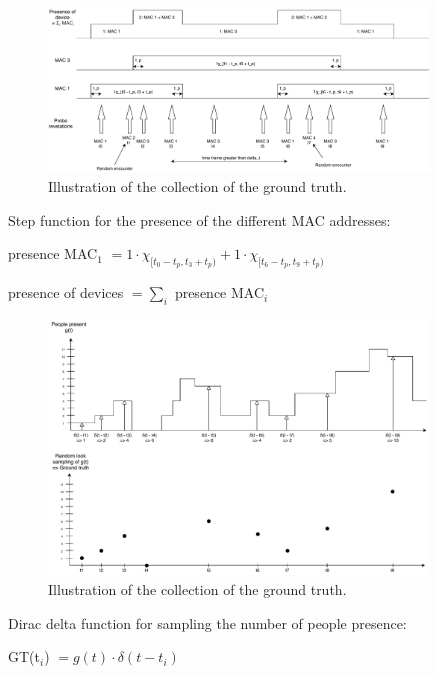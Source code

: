 \begin{figure}[h]
\centering 
\includegraphics[width=0.9\textwidth]{images/presenceMAC} 
\caption{Illustration of the collection of the ground truth.}
\label{fig:presenceMAC}
\end{figure}

Step function for the presence of the different MAC addresses:

presence MAC$_1$ $= 1 \cdot \chi_{[ t_{0} - t_{p}, t_{3} + t_{p} )} + 1 \cdot \chi_{[ t_{6} - t_{p}, t_{9} + t_{p} )}$

presence of devices $= \sum_i$ presence MAC$_i$

\begin{figure}[h]
\centering 
\includegraphics[width=0.9\textwidth]{images/GTprocess} 
\caption{Illustration of the collection of the ground truth.}
\label{fig:GTprocess}
\end{figure}

Dirac delta function for sampling the number of people presence:

GT(t$_i$) $= g(t) \cdot \delta(t - t_{i})$

